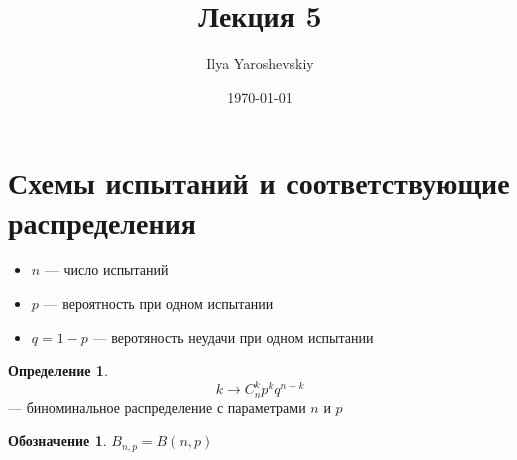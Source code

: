 \documentclass[english]{article}
\author{Ilya Yaroshevskiy}
\date{\today}
\title{Лекция 5}
\theoremstyle{plain}
\theoremstyle{remark}
\theoremstyle{definition}
\newtheorem*{definition}{Определение}
\newtheorem*{symb}{Обозначение}
\begin{document}
\maketitle
\tableofcontents


\section{Схемы испытаний и соответствующие распределения}
\label{sec:orga2079de}
\begin{itemize}
\item \(n\) --- число испытаний
\item \(p\) --- вероятность при одном испытании
\item \(q = 1 - p\) --- веротяность неудачи при одном испытании
\end{itemize}


\begin{definition}
\[ k \to C^k_n p^k q^{n - k} \] --- биноминальное распределение с параметрами \(n\) и \(p\)
\end{definition}
\begin{symb}
\(B_{n,p} = B(n, p)\)
\end{symb}
\end{document}
